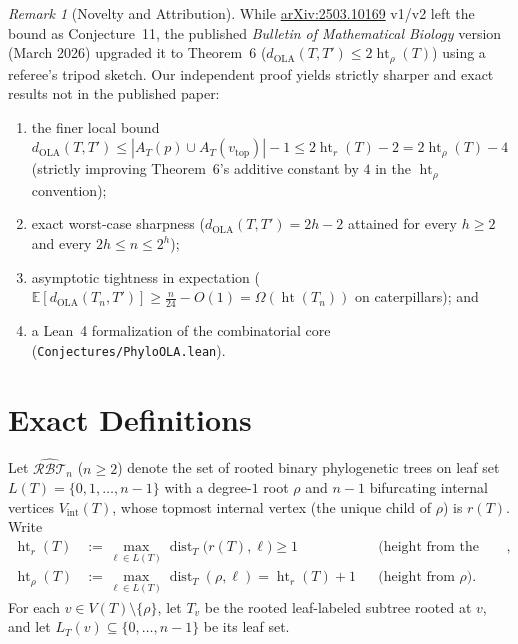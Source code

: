 \documentclass[11pt]{article}
\theoremstyle{definition}
\theoremstyle{remark}
\newtheorem*{remark}{Remark}
\DeclareMathOperator{\dist}{dist}
\DeclareMathOperator{\htr}{ht}
\begin{document}
\begin{remark}[Novelty and Attribution]
While \href{https://arxiv.org/abs/2503.10169}{arXiv:2503.10169} v1/v2 left the bound as Conjecture~11, the published \emph{Bulletin of Mathematical Biology} version (March 2026) upgraded it to Theorem~6 ($d_{\mathrm{OLA}}(T, T') \le 2\htr_\rho(T)$) using a referee's tripod sketch. Our independent proof yields strictly sharper and exact results not in the published paper:
\begin{enumerate}[leftmargin=2em,itemsep=2pt]
  \item the finer local bound $d_{\mathrm{OLA}}(T, T') \le |A_T(p) \cup A_T(v_{\mathrm{top}})| - 1 \le 2\htr_r(T) - 2 = 2\htr_\rho(T) - 4$ (strictly improving Theorem~6's additive constant by $4$ in the $\htr_\rho$ convention);
  \item exact worst-case sharpness ($d_{\mathrm{OLA}}(T, T') = 2h - 2$ attained for every $h \ge 2$ and every $2h \le n \le 2^h$);
  \item asymptotic tightness in expectation ($\mathbb{E}[d_{\mathrm{OLA}}(T_n, T')] \ge \frac{n}{24} - O(1) = \Omega(\htr(T_n))$ on caterpillars); and
  \item a Lean~4 formalization of the combinatorial core (\texttt{Conjectures/PhyloOLA.lean}).
\end{enumerate}
\end{remark}

\section{Exact Definitions}

Let $\widehat{\mathcal{RBT}}_n$ ($n \ge 2$) denote the set of rooted binary phylogenetic trees on leaf set $L(T) = \{0, 1, \dots, n-1\}$ with a degree-$1$ root $\rho$ and $n - 1$ bifurcating internal vertices $V_{\mathrm{int}}(T)$, whose topmost internal vertex (the unique child of $\rho$) is $r(T)$. Write
\begin{align*}
  \htr_r(T) &:= \max_{\ell \in L(T)} \dist_T\bigl(r(T), \ell\bigr) \ge 1 && \text{(height from the topmost bifurcating node)}, \\
  \htr_\rho(T) &:= \max_{\ell \in L(T)} \dist_T(\rho, \ell) = \htr_r(T) + 1 && \text{(height from $\rho$)}.
\end{align*}
For each $v \in V(T) \setminus \{\rho\}$, let $T_v$ be the rooted leaf-labeled subtree rooted at $v$, and let $L_T(v) \subseteq \{0, \dots, n-1\}$ be its leaf set.
\end{document}
